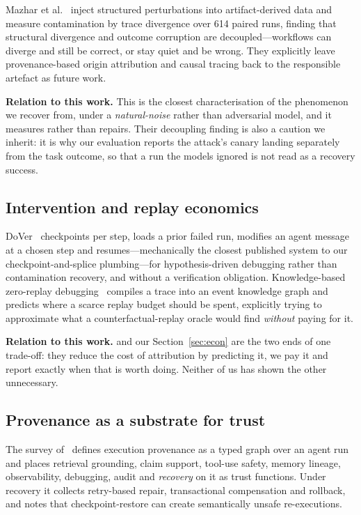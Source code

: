 \documentclass[10pt,twocolumn]{article}
\begin{document}
Mazhar et al.~\cite{tracelevel2026} inject structured perturbations into
artifact-derived data and measure contamination by trace divergence over 614
paired runs, finding that structural divergence and outcome corruption are
decoupled---workflows can diverge and still be correct, or stay quiet and be
wrong. They explicitly leave provenance-based origin attribution and causal
tracing back to the responsible artefact as future work.

\textbf{Relation to this work.} This is the closest characterisation of the
phenomenon we recover from, under a \emph{natural-noise} rather than
adversarial model, and it measures rather than repairs. Their decoupling
finding is also a caution we inherit: it is why our evaluation reports the
attack's canary landing separately from the task outcome, so that a run the
models ignored is not read as a recovery success.

\subsection{Intervention and replay economics}

DoVer~\cite{dover2026} checkpoints per step, loads a prior failed run,
modifies an agent message at a chosen step and resumes---mechanically the
closest published system to our checkpoint-and-splice plumbing---for
hypothesis-driven debugging rather than contamination recovery, and without a
verification obligation. Knowledge-based zero-replay
debugging~\cite{zeroreplay2026} compiles a trace into an event knowledge graph
and predicts where a scarce replay budget should be spent, explicitly trying to
approximate what a counterfactual-replay oracle would find \emph{without}
paying for it.

\textbf{Relation to this work.} \cite{zeroreplay2026} and our
Section~\ref{sec:econ} are the two ends of one trade-off: they reduce the cost
of attribution by predicting it, we pay it and report exactly when that is
worth doing. Neither of us has shown the other unnecessary.

\subsection{Provenance as a substrate for trust}

The survey of~\cite{trustsurvey2026} defines execution provenance as a typed
graph over an agent run and places retrieval grounding, claim support,
tool-use safety, memory lineage, observability, debugging, audit and
\emph{recovery} on it as trust functions. Under recovery it collects
retry-based repair, transactional compensation and rollback, and notes that
checkpoint-restore can create semantically unsafe re-executions.
\end{document}
